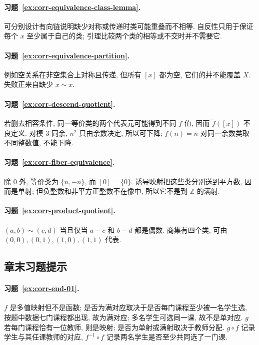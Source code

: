 \documentclass[usesamecnt, thmcnt=section, lang=cn, newtx, 10pt, scheme=chinese]{elegantbook}
\begin{document}
\paragraph*{习题~\ref{ex:corr-equivalence-class-lemma}.}
可分别设计有向链说明缺少对称或传递时类可能重叠而不相等. 自反性只用于保证每个 $x$ 至少属于自己的类; 引理比较两个类的相等或不交时并不需要它.


\paragraph*{习题~\ref{ex:corr-equivalence-partition}.}
例如空关系在非空集合上对称且传递, 但所有 $[x]$ 都为空, 它们的并不能覆盖 $X$. 失败正来自缺少 $x\sim x$.

\paragraph*{习题~\ref{ex:corr-descend-quotient}.}
若删去相容条件, 同一等价类的两个代表元可能得到不同 $f$ 值, 因而 $\widetilde f([x])$ 不良定义. 对模 $3$ 同余, $n^2$ 只由余数决定, 所以可下降; $f(n)=n$ 对同一余数类取不同整数值, 不能下降.


\paragraph*{习题~\ref{ex:corr-fiber-equivalence}.}
除 $0$ 外, 等价类为 $\{n,-n\}$, 而 $[0]=\{0\}$. 诱导映射把这些类分别送到平方数, 因而是单射; 但负整数和非平方正整数不在像中, 所以它不是到 $\mathbb Z$ 的满射.

\paragraph*{习题~\ref{ex:corr-product-quotient}.}
$(a,b)\sim(c,d)$ 当且仅当 $a-c$ 和 $b-d$ 都是偶数. 商集有四个类, 可由 $(0,0),(0,1),(1,0),(1,1)$ 代表.

\subsection*{章末习题提示}

\paragraph*{习题~\ref{ex:corr-end-01}.}
$f$ 是多值映射但不是函数; 是否为满对应取决于是否每门课程至少被一名学生选, 按题中数据七门课程都出现, 故为满对应; 多名学生可选同一课, 故不是单对应. $g$ 若每门课程恰有一位教师, 则是映射; 是否为单射或满射取决于教师分配. $g\circ f$ 记录学生与其任课教师的对应, $f^{-1}\circ f$ 记录两名学生是否至少共同选了一门课.
\end{document}
